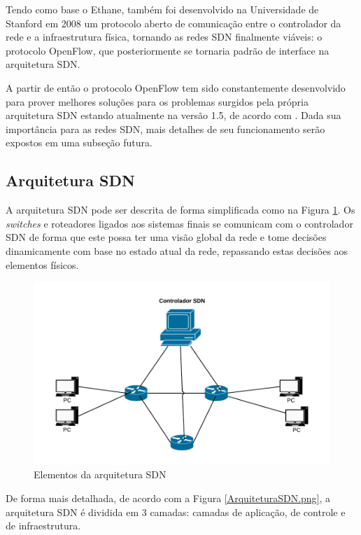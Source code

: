 Tendo como base o Ethane, também foi desenvolvido na Universidade de Stanford em 2008 um protocolo aberto de comunicação entre o controlador da rede e a infraestrutura física, tornando as redes SDN finalmente viáveis: o protocolo OpenFlow, que posteriormente se tornaria padrão de interface na arquitetura SDN.\cite{McKeown:2008:OEI:1355734.1355746} 

A partir de então o protocolo OpenFlow tem sido constantemente desenvolvido para prover melhores soluções para os problemas surgidos pela própria arquitetura SDN estando atualmente na versão 1.5, de acordo com  . Dada sua importância para as redes SDN, mais detalhes de seu funcionamento serão expostos em uma subseção futura.

\subsection{Arquitetura SDN}

  A arquitetura SDN pode ser descrita de forma simplificada como na Figura \ref{SDN.png}. Os \emph{switches} e roteadores ligados aos sistemas finais se comunicam com o controlador SDN de forma que este possa ter uma visão global da rede e tome decisões dinamicamente com base no estado atual da rede, repassando estas decisões aos elementos físicos.

   \begin{figure}[!h]
	\caption{ Elementos da arquitetura SDN}
  \centering
  \includegraphics[scale=0.3]{Imagens/SDN.png} 
 
  \label{SDN.png}
\end{figure}
 
   De forma mais detalhada, de acordo com a Figura \ref{ArquiteturaSDN.png}, a arquitetura SDN  é dividida em 3 camadas: camadas de aplicação, de controle e de infraestrutura.\cite{Nunes}
   
